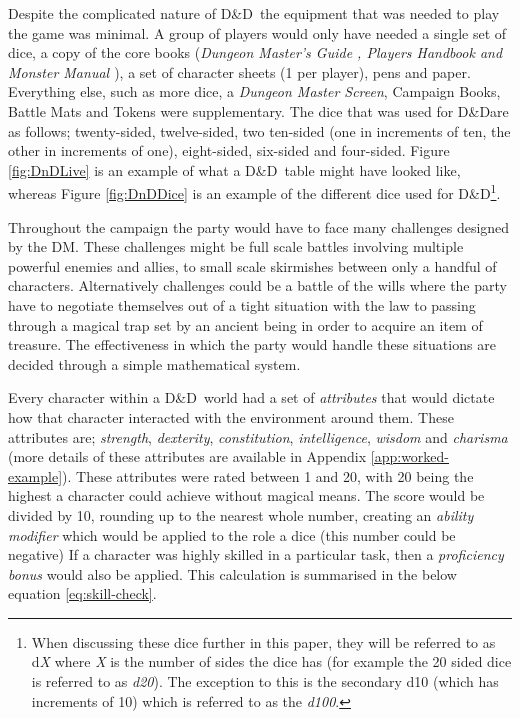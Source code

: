 \documentclass[final]{cmpreport}
\newcommand{\dnd}{D\&D}
\begin{document}
			Despite the complicated nature of \dnd \ the equipment that was needed to play the game was minimal. A group of players would only have needed a single set of dice, a copy of the core books (\emph{Dungeon Master's Guide \citep{DMGuide}, Players Handbook and Monster Manual \citep{MonsterManual}}), a set of character sheets (1 per player), pens and paper. Everything else, such as more dice, a \emph{Dungeon Master Screen}, Campaign Books, Battle Mats and Tokens were supplementary. The dice that was used for \dnd are as follows; twenty-sided, twelve-sided, two ten-sided (one in increments of ten, the other in increments of one), eight-sided, six-sided and four-sided. Figure \ref{fig:DnDLive} is an example of what a \dnd \ table might have looked like, whereas Figure \ref{fig:DnDDice} is an example of the different dice used for \dnd \footnote{When discussing these dice further in this paper, they will be referred to as d\emph{X} where \emph{X} is the number of sides the dice has (for example the 20 sided dice is referred to as \emph{d20}). The exception to this is the secondary d10 (which has increments of 10) which is referred to as the \emph{d100}.}.
			
			Throughout the campaign the party would have to face many challenges designed by the DM. These challenges might be full scale battles involving multiple powerful enemies and allies, to small scale skirmishes between only a handful of characters. Alternatively challenges could be a battle of the wills where the party have to negotiate themselves out of a tight situation with the law to passing through a magical trap set by an ancient being in order to acquire an item of treasure. The effectiveness in which the party would handle these situations are decided through a simple mathematical system. 
			
			Every character within a \dnd \ world had a set of \emph{attributes} that would dictate how that character interacted with the environment around them. These attributes are; \emph{strength}, \emph{dexterity}, \emph{constitution}, \emph{intelligence}, \emph{wisdom} and \emph{charisma} (more details of these attributes are available in Appendix \ref{app:worked-example}). These attributes were rated between 1 and 20, with 20 being the highest a character could achieve without magical means. The score would be divided by 10, rounding up to the nearest whole number, creating an \emph{ability modifier} which would be applied to the role a dice (this number could be negative) If a character was highly skilled in a particular task, then a \emph{proficiency bonus} would also be applied. This calculation is summarised in the below equation \ref{eq:skill-check}. 
			
\end{document}
